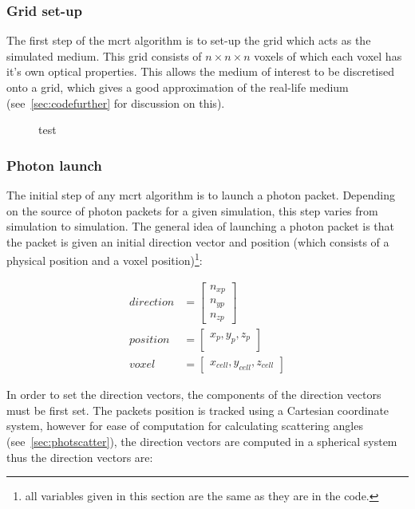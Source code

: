 \subsubsection{Grid set-up}\label{sec:photsetup}

The first step of the \gls{mcrt} algorithm is to set-up the grid which acts as the simulated medium. This grid consists of $n \times n \times n$ voxels of which each voxel has it's own optical properties. This allows the medium of interest to be discretised onto a grid, which gives a good approximation of the real-life medium (see~\cref{sec:codefurther} for discussion on this).


\begin{figure}
\centering
\caption{test}\label{fig:voxeldemo}
\end{figure}

\subsubsection{Photon launch}\label{sec:photlaunch}

The initial step of any \gls{mcrt} algorithm is to launch a photon packet. Depending on the source of photon packets for a given simulation, this step varies from simulation to simulation. The general idea of launching a photon packet is that the packet is given an initial direction vector and position (which consists of a physical position and a voxel position)\footnote{all variables given in this section are the same as they are in the code.}:

\begin{align}
	direction &= \begin{bmatrix}
		n_{xp}\\
		n_{yp}\\
		n_{zp}
	\end{bmatrix}\\
	position &= \begin{bmatrix}
		x_p, y_p, z_p\\
	\end{bmatrix}\\
	voxel &= \begin{bmatrix}
		x_{cell}, y_{cell}, z_{cell}
	\end{bmatrix}	 
\end{align}

In order to set the direction vectors, the components of the direction vectors must be first set. The packets position is tracked using a Cartesian coordinate system, however for ease of computation for calculating scattering angles (see~\cref{sec:photscatter}), the direction vectors are computed in a spherical system thus the direction vectors are: 

